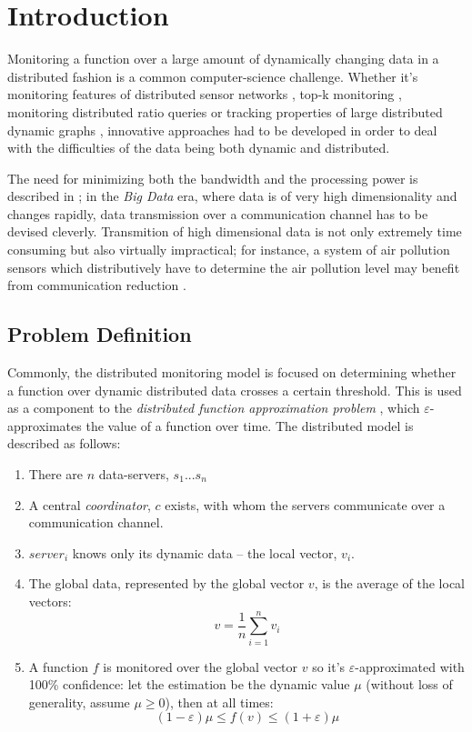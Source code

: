 \documentclass[11pt, conference]{article}
\begin{document}
\section{Introduction}

Monitoring a function over a large amount of dynamically changing data in a distributed fashion is a common computer-science challenge. Whether it's monitoring features of distributed sensor networks \cite{burdakis2012detecting}, top-k monitoring \cite{babcock2003distributed}, monitoring distributed ratio queries \cite{gupta2013ratio} or tracking properties of large distributed dynamic graphs \cite{mcgregor2015densest}, innovative approaches had to be developed in order to deal with the difficulties of the data being both dynamic and distributed.

The need for minimizing both the bandwidth and the processing power is described in \cite{giatrakos2013network}; in the \textit{Big Data} era, where data is of very high dimensionality and changes rapidly, data transmission over a communication channel has to be devised cleverly. Transmition of high dimensional data is not only extremely time consuming but also virtually impractical; for instance, a system of air pollution sensors which distributively have to determine the air pollution level may benefit from communication reduction \cite{cheng2004revised}.

\subsection{Problem Definition}

Commonly, the distributed monitoring model is focused on determining whether a function over dynamic distributed data crosses a certain threshold. This is used as a component to the \textit{distributed function approximation problem} \cite{garofalakis2013sketch}, which $\varepsilon$-approximates the value of a function over time. The distributed model is described as follows:
\begin{enumerate}
\item There are $n$ data-servers, $s_1 ... s_n$
\item A central \textit{coordinator}, $c$ exists, with whom the servers communicate over a communication channel.
\item $server_i$ knows only its dynamic data -- the local vector, $v_i$.
\item The global data, represented by the global vector $v$, is the average of the local vectors:
\begin{equation}
v = \frac{1}{n}\sum\limits_{i=1}^n {v_i}
\end{equation}
\item A function $f$ is monitored over the global vector $v$ so it's $\varepsilon$-approximated with 100\% confidence: let the estimation be the dynamic value $\mu$ (without loss of generality, assume ${\mu \geq 0}$), then at all times: 
\begin{equation}
(1-\varepsilon )\mu \leq f(v) \leq (1+\varepsilon )\mu
\end{equation}
\end{enumerate}
\end{document}
